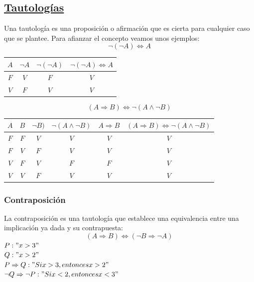 \documentclass[10pt,a4paper,openright]{book}
\begin{document}
\subsection*{\underline{Tautologías}}
Una tautología es una proposición o afirmación que es cierta para cualquier caso que se plantee. Para afianzar el concepto veamos unos ejemplos:
$$\neg(\neg A)\Leftrightarrow A$$
\begin{center}
 \begin{tabular}{ |c|c|c|c| } 
   \hline
     $A$ & $\neg A$ & $\neg (\neg A)$ & $\neg(\neg A)\Leftrightarrow A$ \\ [0.5ex] 
   \hline \hline
     $F$ & $V$ & $F$ & $V$ \\
   \hline 
     $V$ & $F$ & $V$ & $V$ \\
   \hline
 \end{tabular}
\end{center}

$$(A \Rightarrow B)\Leftrightarrow \neg (A \wedge \neg B)$$
\begin{center}
 \begin{tabular}{ |c|c|c|c|c|c| } 
   \hline
     $A$ & $B$ & $\neg B)$ & $\neg (A \wedge \neg B)$ & $A \Rightarrow B$ & $(A \Rightarrow B)\Leftrightarrow \neg (A \wedge \neg B)$ \\ [0.5ex]
      
   \hline \hline
     $F$ & $F$ & $V$ & $V$ & $V$ & $V$ \\
   \hline 
     $F$ & $V$ & $F$ & $V$ & $V$ & $V$\\
   \hline
     $V$ & $F$ & $V$ & $F$ & $F$ & $V$ \\
   \hline
     $V$ & $V$ & $F$ & $V$ & $V$ & $V$ \\
   \hline 
 \end{tabular}
\end{center}

\subsubsection*{Contraposición}
La contraposición es una tautología que establece una equivalencia entre una implicación ya dada y su contrapuesta:
$$(A \Rightarrow B) \Leftrightarrow (\neg B \Rightarrow \neg A)$$
$P:"x>3"$ \\
$Q:"x > 2"$ \\
$P \Rightarrow Q:"Si x>3, entonces x>2"$ \\
$\neg Q \Rightarrow \neg P:"Si x<2, entonces x<3"$ \\
\end{document}
